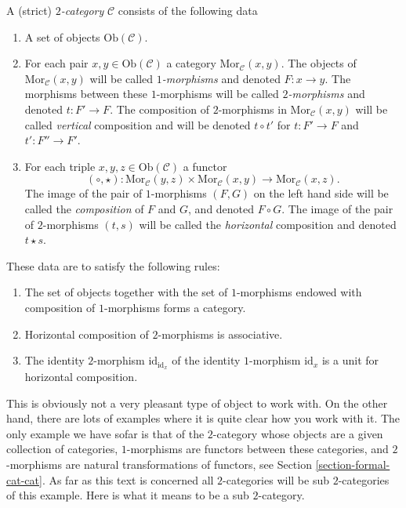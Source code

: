 \begin{definition}
\label{definition-2-category}
A (strict) {\it $2$-category} $\mathcal{C}$ consists of the following data
\begin{enumerate}
\item A set of objects $\text{Ob}(\mathcal{C})$.
\item For each pair $x, y \in \text{Ob}(\mathcal{C})$
a category $\text{Mor}_\mathcal{C}(x, y)$. The objects of
$\text{Mor}_\mathcal{C}(x, y)$ will be called {\it $1$-morphisms}
and denoted $F : x \to y$. The morphisms between these $1$-morphisms
will be called {\it $2$-morphisms} and denoted $t : F' \to F$.
The composition of $2$-morphisms in $\text{Mor}_\mathcal{C}(x, y)$
will be called {\it vertical} composition and will be
denoted $t \circ t'$ for $t : F' \to F$ and $t' : F'' \to F'$.
\item For each triple $x, y, z\in \text{Ob}(\mathcal{C})$ a
functor
$$
(\circ, \star) :
\text{Mor}_\mathcal{C}(y, z) \times \text{Mor}_\mathcal{C}(x, y)
\longrightarrow
\text{Mor}_\mathcal{C}(x, z).
$$
The image of the pair of $1$-morphisms $(F, G)$ on the left hand side
will be called the {\it composition} of $F$ and $G$, and denoted
$F\circ G$. The image of the pair of $2$-morphisms $(t, s)$ will
be called the {\it horizontal} composition and denoted $t \star s$.
\end{enumerate}
These data are to satisfy the following rules:
\begin{enumerate}
\item The set of objects together with the set of $1$-morphisms endowed
with composition of $1$-morphisms forms a category.
\item Horizontal composition of $2$-morphisms is associative.
\item The identity $2$-morphism $\text{id}_{\text{id}_x}$
of the identity $1$-morphism $\text{id}_x$ is a unit for
horizontal composition.
\end{enumerate}
\end{definition}

\noindent
This is obviously not a very pleasant type of object to work with.
On the other hand, there are lots of examples where it is quite clear
how you work with it. The only example we have sofar is that of
the $2$-category whose objects are a given collection of categories,
$1$-morphisms are functors between these categories,
and $2$-morphisms are natural transformations of functors, see
Section \ref{section-formal-cat-cat}.
As far as this text is concerned all $2$-categories will be
sub $2$-categories of this example. Here is what it means to be
a sub $2$-category.


